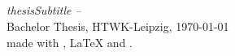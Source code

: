 \null
\vfill
\begin{flushright}
    \textbf{\thesisAuthor}\\
    \thesisAuthorAddress\\
    \href{mailto:\thesisAuthorEmail}{\thesisAuthorEmail}\\
    \href{http://\thesisAuthorWebsite}{\thesisAuthorWebsite}\\
    \vspace{12pt}
    \textit{\textbf{
	    \thesisTitle{}}
	    \ifcsname thesisSubtitle \endcsname
		    -- \thesisSubtitle
		\else
		\fi
		}\\
    Bachelor Thesis, HTWK-Leipzig, \today\\
    \vspace{12pt}
    made with \XeTeX{}, \LaTeX{} and \BibTeX{}.
\end{flushright}